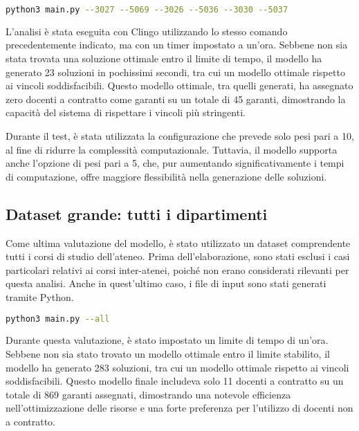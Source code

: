 \begin{lstlisting}[language=bash]
 python3 main.py --3027 --5069 --3026 --5036 --3030 --5037
\end{lstlisting}

L'analisi è stata eseguita con Clingo utilizzando lo stesso comando precedentemente indicato, 
ma con un timer impostato a un'ora. Sebbene non sia stata trovata una soluzione ottimale 
entro il limite di tempo, il modello ha generato 23 soluzioni in pochissimi secondi, 
tra cui un modello ottimale rispetto ai vincoli soddisfacibili. Questo modello ottimale, 
tra quelli generati, ha assegnato zero docenti a contratto come garanti su un totale di 45 
garanti, dimostrando la capacità del sistema di rispettare i vincoli più stringenti.

Durante il test, è stata utilizzata la configurazione che prevede solo pesi pari a 10, al 
fine di ridurre la complessità computazionale. Tuttavia, il modello supporta anche l'opzione 
di pesi pari a 5, che, pur aumentando significativamente i tempi di computazione, offre 
maggiore flessibilità nella generazione delle soluzioni.


\subsection{Dataset grande: tutti i dipartimenti}
\label{sec:dataset-tutti-dipartimenti}

Come ultima valutazione del modello, è stato utilizzato un dataset comprendente tutti i corsi 
di studio dell'ateneo. Prima dell'elaborazione, sono stati esclusi i casi particolari relativi 
ai corsi inter-atenei, poiché non erano considerati rilevanti per questa analisi.
Anche in quest'ultimo caso, i file di input sono stati generati tramite Python.
\begin{lstlisting}[language=bash]
 python3 main.py --all
\end{lstlisting}

Durante questa valutazione, è stato impostato un limite di tempo di un'ora. Sebbene non sia stato 
trovato un modello ottimale entro il limite stabilito, il modello ha generato 283 soluzioni, 
tra cui un modello ottimale rispetto ai vincoli soddisfacibili. Questo modello finale includeva 
solo 11 docenti a contratto su un totale di 869 garanti assegnati, dimostrando una notevole 
efficienza nell'ottimizzazione delle risorse e una forte preferenza per l'utilizzo di docenti non a contratto.
